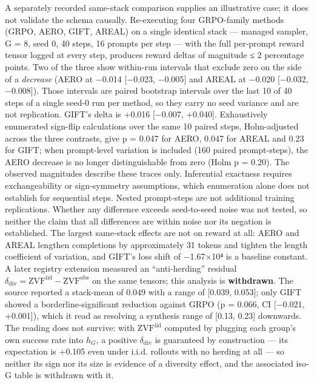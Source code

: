 \documentclass[12pt,a4paper]{report}
\begin{document}
A separately recorded same-stack comparison supplies an illustrative
case; it does not validate the schema causally. Re-executing four
GRPO-family methods (GRPO, AERO, GIFT, AREAL) on a single identical
stack --- managed sampler, G = 8, seed 0, 40 steps, 16 prompts per step
--- with the full per-prompt reward tensor logged at every step,
produces reward deltas of magnitude ≤ 2 percentage points. Two of the
three show within-run intervals that exclude zero on the side of a
\emph{decrease} (AERO at −0.014 {[}−0.023, −0.005{]} and AREAL at −0.020
{[}−0.032, −0.008{]}). Those intervals are paired bootstrap intervals
over the last 10 of 40 steps of a single seed-0 run per method, so they
carry no seed variance and are not replication. GIFT's delta is +0.016
{[}−0.007, +0.040{]}. Exhaustively enumerated sign-flip calculations
over the same 10 paired steps, Holm-adjusted across the three contrasts,
give p = 0.047 for AERO, 0.047 for AREAL and 0.23 for GIFT; when
prompt-level variation is included (160 paired prompt-steps), the AERO
decrease is no longer distinguishable from zero (Holm p = 0.20). The
observed magnitudes describe these traces only. Inferential exactness
requires exchangeability or sign-symmetry assumptions, which enumeration
alone does not establish for sequential steps. Nested prompt-steps are
not additional training replications. Whether any difference exceeds
seed-to-seed noise was not tested, so neither the claim that all
differences are within noise nor its negation is established. The
largest same-stack effects are not on reward at all: AERO and AREAL
lengthen completions by approximately 31 tokens and tighten the length
coefficient of variation, and GIFT's loss shift of −1.67×10⁴ is a
baseline constant. A later registry extension measured an
``anti-herding'' residual
\(\delta_{\mathrm{div}} = \mathrm{ZVF}^{\mathrm{iid}} - \mathrm{ZVF}^{\mathrm{obs}}\)
on the same tensors; this analysis is \textbf{withdrawn}. The source
reported a stack-mean of 0.049 with a range of {[}0.039, 0.053{]}; only
GIFT showed a borderline-significant reduction against GRPO (p = 0.066,
CI {[}−0.021, +0.001{]}), which it read as resolving a synthesis range
of {[}0.13, 0.23{]} downwards. The reading does not survive: with
\(\mathrm{ZVF}^{\mathrm{iid}}\) computed by plugging each group's own
success rate into \(h_G\), a positive \(\delta_{\mathrm{div}}\) is
guaranteed by construction --- its expectation is +0.105 even under
i.i.d. rollouts with no herding at all --- so neither its sign nor its
size is evidence of a diversity effect, and the associated iso-G table
is withdrawn with it.
\end{document}
